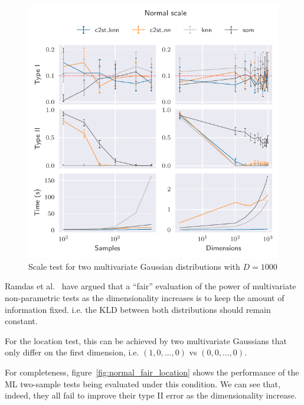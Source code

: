 \begin{figure}[htbp]
    \centering
    \includegraphics{images/6_som/normal_scale}
    \caption{Scale test for two multivariate Gaussian distributions with $D=1000$}
    \label{fig:normal_scale}
\end{figure}

Ramdas et al.~\cite{ramdas2015decreasing} have argued that a ``fair'' evaluation of the
power of multivariate non-parametric tests as the dimensionality increases is to keep the
amount of information fixed. i.e. the \gls{KLD} between both distributions
should remain constant.

For the location test, this can be achieved by two multivariate Gaussians that only differ
on the first dimension, i.e. $(1, 0, \ldots, 0)$ vs $(0, 0, \ldots, 0)$.

For completeness, figure~\ref{fig:normal_fair_location} shows the performance of the ML two-sample
tests being evaluated under this condition. We can see that, indeed, they all fail to improve
their type II error as the dimensionality increase.

